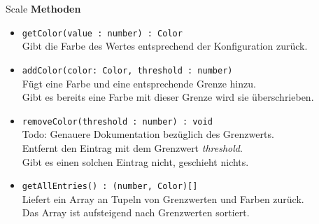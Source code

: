     \begin{Class}{Scale}
        \textbf{Methoden}
        \begin{itemize}
            \item \texttt{getColor(value : number) : Color}
            \\ Gibt die Farbe des Wertes entsprechend der Konfiguration zurück.
            \item \texttt{addColor(color: Color, threshold : number)}
            \\ Fügt eine Farbe und eine entsprechende Grenze hinzu.
            \\ Gibt es bereits eine Farbe mit dieser Grenze wird sie überschrieben.
            \item \texttt{removeColor(threshold : number) : void}
            \\ Todo: Genauere Dokumentation bezüglich des Grenzwerts. 
            \\ Entfernt den Eintrag mit dem Grenzwert \emph{threshold}.
            \\ Gibt es einen solchen Eintrag nicht, geschieht nichts.
            \item \texttt{getAllEntries() : (number, Color)[]}
            \\ Liefert ein Array an Tupeln von Grenzwerten und Farben zurück.
            \\ Das Array ist aufsteigend nach Grenzwerten sortiert.
        \end{itemize}
    \end{Class}
